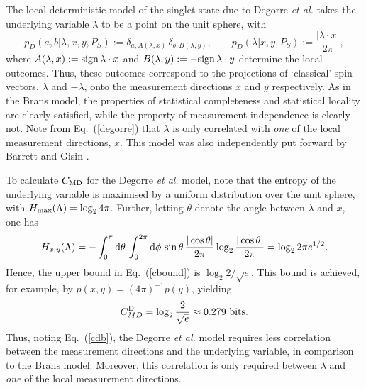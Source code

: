 \documentclass[graybox]{svmult}
\begin{document}

The local deterministic model of the singlet state due to Degorre {\it et al.} takes the underlying variable $\lambda$ to be a point on the unit sphere, with~\cite{degorre}
\begin{equation} \label{degorre}
p_D(a,b|\lambda,x,y,P_S) :=\delta_{a,A(\lambda,x)} \, \delta_{b,B(\lambda,y)},\qquad p_D(\lambda|x,y,P_S) := \frac{|\lambda \cdot x|}{2\pi},
\end{equation}
where $A(\lambda,x):={\rm sign}\,\lambda\cdot x$ and $B(\lambda,y):=-{\rm sign}\,\lambda\cdot y$ determine the local outcomes. Thus, these outcomes correspond to the projections of `classical' spin vectors, $\lambda$ and $-\lambda$, onto the measurement directions $x$ and $y$ respectively. As in the Brans model, the properties of statistical completeness and statistical locality are clearly satisfied, while the property of measurement independence is clearly not. Note from Eq.~(\ref{degorre}) that $\lambda$ is only correlated with  {\it one} of the local measurement directions, $x$.  This model was also independently put forward by Barrett and Gisin \cite{bg}.

To calculate $C_{\rm MD}$ for the Degorre {\it et al.} model, note that the entropy of the underlying variable is maximised by a uniform distribution over the unit sphere, with $H_{\rm max}(\Lambda)=\log_2 4\pi$. Further, letting $\theta$ denote the angle between $\lambda$ and $x$, one has
\[
H_{x,y}(\Lambda) = -\int_0^\pi \mathrm{d}\theta\, \int_0^{2\pi}\mathrm{d} \phi \,\sin \theta\, \frac{|\cos\theta|}{2\pi} \log_2 \frac{|\cos\theta|}{2\pi} 
= \log_2 2\pi e^{1/2} .
\]
Hence, the upper bound in Eq.~(\ref{cbound}) is $\log_2 2/\sqrt{e}$.  This bound is achieved, for example, by $p(x,y)=(4\pi)^{-1}p(y)$, yielding \cite{bg}
\begin{equation} \label{cdeg}
C^{\rm D}_{MD} = \log_2 \frac{2}{\sqrt{e}} \approx 0.279~{\rm bits}.
\end{equation}
Thus, noting Eq.~(\ref{cdb}), the Degorre {\it et al.} model requires less correlation between the measurement directions and the underlying variable, in comparison to the Brans model.  Moreover, this correlation is only required between $\lambda$ and {\it one} of the local measurement directions.  


\end{document}

